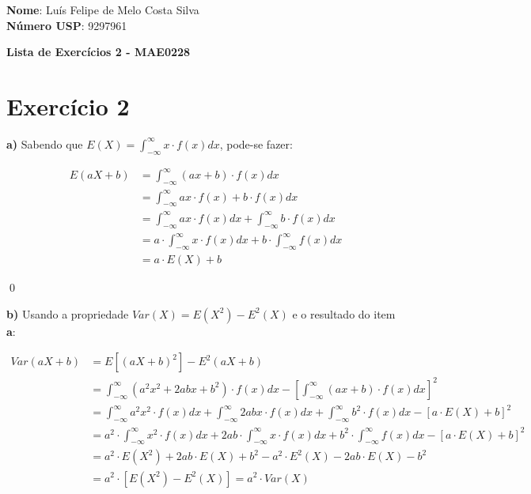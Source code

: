 \documentclass[12pt,letterpaper]{article}
\begin{document}
	
	\textbf{Nome}: Luís Felipe de Melo Costa Silva \\
	\textbf{Número USP}: 9297961 
	
	\begin{center}
		\LARGE \bf
		Lista de Exercícios 2 - MAE0228
	\end{center}
	
	\section*{Exercício 2}
	
	\textbf{a)} Sabendo que $E(X) = \int_{-\infty}^{\infty} x \cdot f(x)dx$, pode-se fazer:
	
	\begin{equation*}
		\begin{split}
			E(aX+b) & = \int_{-\infty}^{\infty} (ax+b) \cdot f(x)dx \\
			& = \int_{-\infty}^{\infty} ax \cdot f(x) + b\cdot f(x)dx \\
			& = \int_{-\infty}^{\infty} ax \cdot f(x)dx + \int_{-\infty}^{\infty}b\cdot f(x)dx \\
			& = a \cdot \int_{-\infty}^{\infty} x \cdot f(x)dx + b\cdot \int_{-\infty}^{\infty} f(x)dx \\
			& = a \cdot E(X) + b
		\end{split}
	\end{equation*}
	
	\qed
	
	\textbf{b)} Usando a propriedade $Var(X) = E(X^2) - E^2(X)$ e o resultado do item \textbf{a}:
	
	\begin{equation*}
		\begin{split}
			Var(aX+b) & = E[(aX+b)^2] - E^2(aX+b) \\
			& = \int_{-\infty}^{\infty} (a^2x^2 + 2abx + b^2) \cdot f(x)dx - [\int_{-\infty}^{\infty} (ax+b) \cdot f(x)dx]^2 \\
			& = \int_{-\infty}^{\infty} a^2x^2 \cdot f(x)dx+ \int_{-\infty}^{\infty} 2abx \cdot f(x)dx + \int_{-\infty}^{\infty} b^2 \cdot f(x)dx - [a \cdot E(X) + b]^2 \\
			& = a^2 \cdot \int_{-\infty}^{\infty} x^2 \cdot f(x)dx+ 2ab \cdot \int_{-\infty}^{\infty} x \cdot f(x)dx + b^2 \cdot \int_{-\infty}^{\infty} f(x)dx - [a \cdot E(X) + b]^2 \\
			& = a^2 \cdot E(X^2) + 2ab \cdot E(X) + b^2 - a^2 \cdot E^2(X) - 2ab \cdot E(X) - b^2\\
			& = a^2 \cdot [E(X^2) - E^2(X)] = a^2 \cdot Var(X) 
		\end{split}
	\end{equation*}
	
\end{document}
